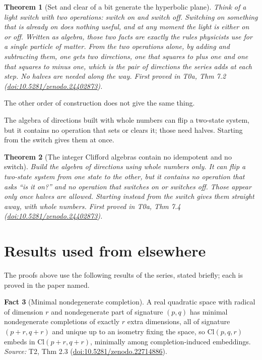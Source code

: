 \documentclass[11pt]{article}
\newtheorem{theorem}{Theorem}[section]
\theoremstyle{definition}
\newtheorem{fact}[theorem]{Fact}
\theoremstyle{plain}
\providecommand{\Cl}{}\renewcommand{\Cl}{\mathrm{Cl}}
\begin{document}
\begin{theorem}[Set and clear of a bit generate the hyperbolic plane]\label{c:synthesis.set-and-clear-of-a-bit-generate-the-hyperbolic-plane}
Think of a light switch with two operations: switch on and switch off. Switching on something that is already on does nothing useful, and at any moment the light is either on or off. Written as algebra, those two facts are exactly the rules physicists use for a single particle of matter. From the two operations alone, by adding and subtracting them, one gets two directions, one that squares to plus one and one that squares to minus one, which is the pair of directions the series adds at each step. No halves are needed along the way.
\emph{First proved in} T0a, Thm 7.2 (\href{https://doi.org/10.5281/zenodo.24402873}{doi:10.5281/zenodo.24402873}).
\end{theorem}

The other order of construction does not give the same thing.

The algebra of directions built with whole numbers can flip a two-state system, but it contains no operation that sets or clears it; those need halves. Starting from the switch gives them at once.

\begin{theorem}[The integer Clifford algebras contain no idempotent and no switch]\label{c:synthesis.integer-clifford-algebras-contain-no-switch}
Build the algebra of directions using whole numbers only. It can flip a two-state system from one state to the other, but it contains no operation that asks ``is it on?'' and no operation that switches on or switches off. Those appear only once halves are allowed. Starting instead from the switch gives them straight away, with whole numbers.
\emph{First proved in} T0a, Thm 7.4 (\href{https://doi.org/10.5281/zenodo.24402873}{doi:10.5281/zenodo.24402873}).
\end{theorem}

\section{Results used from elsewhere}
The proofs above use the following results of the series, stated briefly; each is proved in the paper named.

\begin{fact}[Minimal nondegenerate completion]\label{c:conformal.minimal-nondegenerate-completion}
A real quadratic space with radical of dimension $r$ and nondegenerate part of signature $(p,q)$ has minimal nondegenerate completions of exactly $r$ extra dimensions, all of signature $(p+r,q+r)$ and unique up to an isometry fixing the space, so $\Cl(p,q,r)$ embeds in $\Cl(p+r,q+r)$, minimally among completion-induced embeddings.
\emph{Source:} T2, Thm 2.3 (\href{https://doi.org/10.5281/zenodo.22714886}{doi:10.5281/zenodo.22714886}).
\end{fact}
\end{document}
